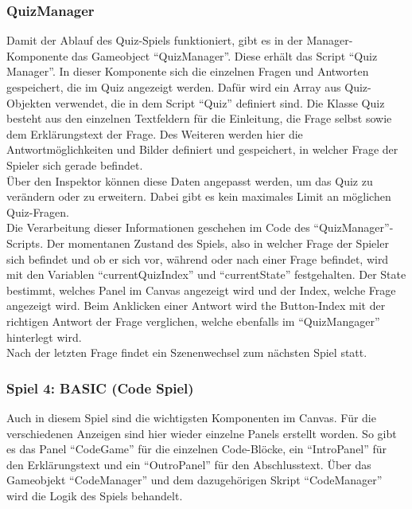 \subsubsection*{QuizManager}
Damit der Ablauf des Quiz-Spiels funktioniert, gibt es in der Manager-Komponente das Gameobject “QuizManager”. Diese erhält das Script “Quiz Manager”. In dieser Komponente sich die einzelnen Fragen und Antworten gespeichert, die im Quiz angezeigt werden. Dafür wird ein Array aus Quiz-Objekten verwendet, die in dem Script “Quiz” definiert sind. Die Klasse Quiz besteht aus den einzelnen Textfeldern für die Einleitung, die Frage selbst sowie dem Erklärungstext der Frage. Des Weiteren werden hier die Antwortmöglichkeiten und Bilder definiert und gespeichert, in welcher Frage der Spieler sich gerade befindet.\\ 
Über den Inspektor können diese Daten angepasst werden, um das Quiz zu verändern oder zu erweitern. Dabei gibt es kein maximales Limit an möglichen Quiz-Fragen.\\ 
Die Verarbeitung dieser Informationen geschehen im Code des “QuizManager”-Scripts. Der momentanen Zustand des Spiels, also in welcher Frage der Spieler sich befindet und ob er sich vor, während oder nach einer Frage befindet, wird mit den Variablen “currentQuizIndex” und “currentState” festgehalten. Der State bestimmt, welches Panel im Canvas angezeigt wird und der Index, welche Frage angezeigt wird. Beim Anklicken einer Antwort wird the Button-Index mit der richtigen Antwort der Frage verglichen, welche ebenfalls im “QuizMangager” hinterlegt wird.\\
Nach der letzten Frage findet ein Szenenwechsel zum nächsten Spiel statt.

\subsubsection{Spiel 4: BASIC (Code Spiel)}
Auch in diesem Spiel sind die wichtigsten Komponenten im Canvas. Für die verschiedenen Anzeigen sind hier wieder einzelne Panels erstellt worden. So gibt es das Panel “CodeGame” für die einzelnen Code-Blöcke, ein “IntroPanel” für den Erklärungstext und ein “OutroPanel” für den Abschlusstext. Über das Gameobjekt “CodeManager” und dem dazugehörigen Skript “CodeManager” wird die Logik des Spiels behandelt. 

